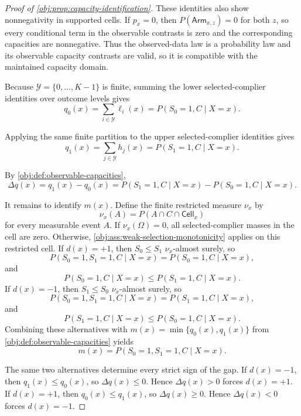 \begin{proof}[Proof of \cref{obj:prop:capacity-identification}]
These identities also show nonnegativity in supported cells.  If \(p_x=0\), then \(P(\mathsf{Arm}_{x,z})=0\) for both \(z\), so every conditional term in the observable contrasts is zero and the corresponding capacities are nonnegative.  Thus the observed-data law is a probability law and its observable capacity contrasts are valid, so it is compatible with the maintained capacity domain.

Because \(\mathcal Y=\{0,\ldots,K-1\}\) is finite, summing the lower selected-complier identities over outcome levels gives
\[
q_0(x)=\sum_{i\in\mathcal Y}\ell_i(x)
=
P(S_0=1,C\mid X=x).
\]

Applying the same finite partition to the upper selected-complier identities gives
\[
q_1(x)=\sum_{j\in\mathcal Y}h_j(x)
=
P(S_1=1,C\mid X=x).
\]

By \cref{obj:def:observable-capacities},
\[
\Delta q(x)=q_1(x)-q_0(x)
=
P(S_1=1,C\mid X=x)-P(S_0=1,C\mid X=x).
\]

It remains to identify \(m(x)\).  Define the finite restricted measure \(\nu_x\) by
\[
\nu_x(A)=P(A\cap C\cap\mathsf{Cell}_x)
\]
for every measurable event \(A\).  If \(\nu_x(\Omega)=0\), all selected-complier masses in the cell are zero.  Otherwise, \cref{obj:ass:weak-selection-monotonicity} applies on this restricted cell.  If \(d(x)=+1\), then \(S_0\le S_1\) \(\nu_x\)-almost surely, so
\[
P(S_0=1,S_1=1,C\mid X=x)=P(S_0=1,C\mid X=x),
\]
and
\[
P(S_0=1,C\mid X=x)\le P(S_1=1,C\mid X=x).
\]
If \(d(x)=-1\), then \(S_1\le S_0\) \(\nu_x\)-almost surely, so
\[
P(S_0=1,S_1=1,C\mid X=x)=P(S_1=1,C\mid X=x),
\]
and
\[
P(S_1=1,C\mid X=x)\le P(S_0=1,C\mid X=x).
\]
Combining these alternatives with \(m(x)=\min\{q_0(x),q_1(x)\}\) from \cref{obj:def:observable-capacities} yields
\[
m(x)=P(S_0=1,S_1=1,C\mid X=x).
\]

The same two alternatives determine every strict sign of the gap.  If \(d(x)=-1\), then \(q_1(x)\le q_0(x)\), so \(\Delta q(x)\le0\).  Hence \(\Delta q(x)>0\) forces \(d(x)=+1\).  If \(d(x)=+1\), then \(q_0(x)\le q_1(x)\), so \(\Delta q(x)\ge0\).  Hence \(\Delta q(x)<0\) forces \(d(x)=-1\).


\end{proof}
